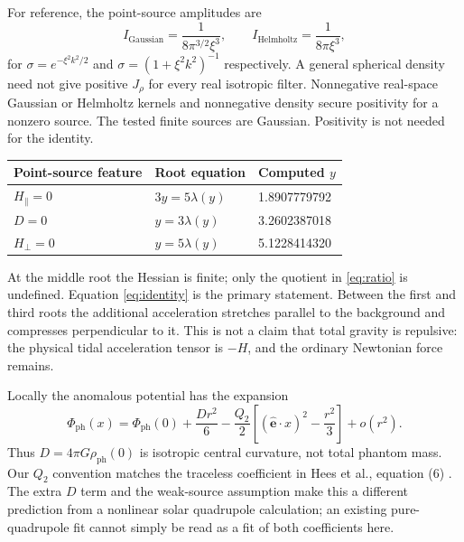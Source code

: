 \documentclass[11pt,letterpaper]{article}
\newcommand{\ph}{\mathrm{ph}}\newcommand{\dd}{\mathrm{d}}
\newcommand{\ee}{\hat{\boldsymbol e}}\newcommand{\kk}{\hat{\boldsymbol k}}
\begin{document}
For reference, the point-source amplitudes are
\begin{equation}
 I_{\mathrm{Gaussian}}=\frac{1}{8\pi^{3/2}\xi^3},\qquad
 I_{\mathrm{Helmholtz}}=\frac{1}{8\pi\xi^3},
\end{equation}
for $\sigma=e^{-\xi^2k^2/2}$ and $\sigma=(1+\xi^2k^2)^{-1}$ respectively.
A general spherical density need not give positive $J_\rho$ for every real
isotropic filter. Nonnegative real-space Gaussian or Helmholtz kernels and
nonnegative density secure positivity for a nonzero source. The tested finite
sources are Gaussian. Positivity is not needed for the identity.

\begin{center}
\begin{tabular}{lll}
\toprule
Point-source feature & Root equation & Computed $y$\\
\midrule
$H_\parallel=0$ & $3y=5\lambda(y)$ & 1.8907779792\\
$D=0$ & $y=3\lambda(y)$ & 3.2602387018\\
$H_\perp=0$ & $y=5\lambda(y)$ & 5.1228414320\\
\bottomrule
\end{tabular}
\end{center}
At the middle root the Hessian is finite; only the quotient in
\eqref{eq:ratio} is undefined. Equation \eqref{eq:identity} is the primary
statement. Between the first and third roots the additional acceleration
stretches parallel to the background and compresses perpendicular to it.
This is not a claim that total gravity is repulsive: the physical tidal
acceleration tensor is $-H$, and the ordinary Newtonian force remains.

Locally the anomalous potential has the expansion
\begin{equation}
 \Phi_{\ph}(x)=\Phi_{\ph}(0)+\frac{D r^2}{6}
 -\frac{Q_2}{2}\left[(\ee\cdot x)^2-\frac{r^2}{3}\right]+o(r^2).
 \label{eq:local}
\end{equation}
Thus $D=4\pi G\rho_{\ph}(0)$ is isotropic central curvature, not total
phantom mass. Our $Q_2$ convention matches the traceless coefficient in
Hees et al., equation (6) \cite{hees}. The extra $D$ term and the weak-source
assumption make this a different prediction from a nonlinear solar
quadrupole calculation; an existing pure-quadrupole fit cannot simply be
read as a fit of both coefficients here.

\newpage
\end{document}

